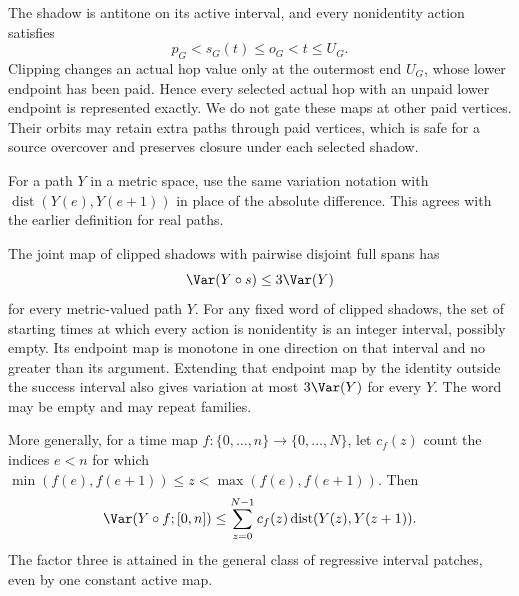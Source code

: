 The shadow is antitone on its active interval, and every nonidentity
action satisfies
\begin{equation}\label{eq:strict-shadow}
 p_G<s_G(t)\le o_G<t\le U_G.
\end{equation}
Clipping changes an actual hop value only at the outermost end $U_G$,
whose lower endpoint has been paid. Hence every selected actual hop
with an unpaid lower endpoint is represented exactly. We do not gate
these maps at other paid vertices. Their orbits may retain extra paths
through paid vertices, which is safe for a source overcover and preserves
closure under each selected shadow.

For a path $Y$ in a metric space, use the same variation notation with
$\operatorname{dist}(Y(e),Y(e+1))$ in place of the absolute difference.
This agrees with the earlier definition for real paths.

\begin{lemma}
\label{lem:shadow-variation}
The joint map of clipped shadows with pairwise disjoint full spans has
\[
 \Var(Y\circ s)\le3\Var(Y)
\]
for every metric-valued path $Y$. For any fixed word of clipped shadows,
the set of starting times at which every action is nonidentity is an
integer interval, possibly empty. Its endpoint map is monotone in one
direction on that interval and no greater than its argument. Extending
that endpoint map by the identity outside the success interval also
gives variation at most $3\Var(Y)$ for every $Y$. The word may be empty
and may repeat families.

More generally, for a time map $f:\{0,\ldots,n\}\to\{0,\ldots,N\}$,
let $c_f(z)$ count the indices $e<n$ for which
$\min(f(e),f(e+1))\le z<\max(f(e),f(e+1))$. Then
\begin{equation}\label{eq:crossing-variation}
 \Var(Y\circ f;[0,n])
 \le\sum_{z=0}^{N-1}c_f(z)\operatorname{dist}(Y(z),Y(z+1)).
\end{equation}
The factor three is attained in the general class of regressive interval
patches, even by one constant active map.
\end{lemma}

